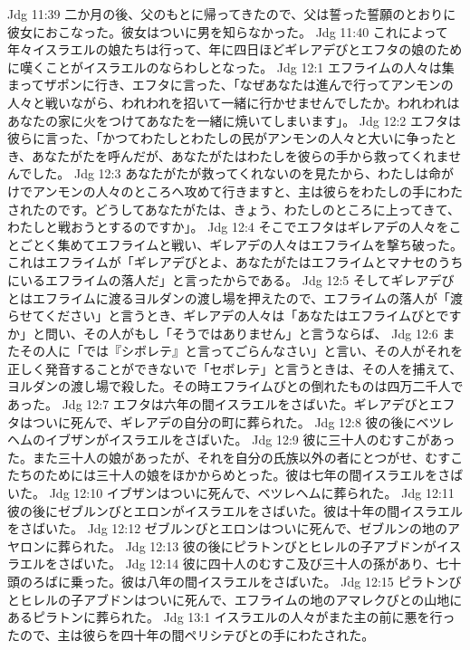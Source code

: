 Jdg 11:39  二か月の後、父のもとに帰ってきたので、父は誓った誓願のとおりに彼女におこなった。彼女はついに男を知らなかった。
Jdg 11:40  これによって年々イスラエルの娘たちは行って、年に四日ほどギレアデびとエフタの娘のために嘆くことがイスラエルのならわしとなった。
Jdg 12:1  エフライムの人々は集まってザポンに行き、エフタに言った、「なぜあなたは進んで行ってアンモンの人々と戦いながら、われわれを招いて一緒に行かせませんでしたか。われわれはあなたの家に火をつけてあなたを一緒に焼いてしまいます」。
Jdg 12:2  エフタは彼らに言った、「かつてわたしとわたしの民がアンモンの人々と大いに争ったとき、あなたがたを呼んだが、あなたがたはわたしを彼らの手から救ってくれませんでした。
Jdg 12:3  あなたがたが救ってくれないのを見たから、わたしは命がけでアンモンの人々のところへ攻めて行きますと、主は彼らをわたしの手にわたされたのです。どうしてあなたがたは、きょう、わたしのところに上ってきて、わたしと戦おうとするのですか」。
Jdg 12:4  そこでエフタはギレアデの人々をことごとく集めてエフライムと戦い、ギレアデの人々はエフライムを撃ち破った。これはエフライムが「ギレアデびとよ、あなたがたはエフライムとマナセのうちにいるエフライムの落人だ」と言ったからである。
Jdg 12:5  そしてギレアデびとはエフライムに渡るヨルダンの渡し場を押えたので、エフライムの落人が「渡らせてください」と言うとき、ギレアデの人々は「あなたはエフライムびとですか」と問い、その人がもし「そうではありません」と言うならば、
Jdg 12:6  またその人に「では『シボレテ』と言ってごらんなさい」と言い、その人がそれを正しく発音することができないで「セボレテ」と言うときは、その人を捕えて、ヨルダンの渡し場で殺した。その時エフライムびとの倒れたものは四万二千人であった。
Jdg 12:7  エフタは六年の間イスラエルをさばいた。ギレアデびとエフタはついに死んで、ギレアデの自分の町に葬られた。
Jdg 12:8  彼の後にベツレヘムのイブザンがイスラエルをさばいた。
Jdg 12:9  彼に三十人のむすこがあった。また三十人の娘があったが、それを自分の氏族以外の者にとつがせ、むすこたちのためには三十人の娘をほかからめとった。彼は七年の間イスラエルをさばいた。
Jdg 12:10  イブザンはついに死んで、ベツレヘムに葬られた。
Jdg 12:11  彼の後にゼブルンびとエロンがイスラエルをさばいた。彼は十年の間イスラエルをさばいた。
Jdg 12:12  ゼブルンびとエロンはついに死んで、ゼブルンの地のアヤロンに葬られた。
Jdg 12:13  彼の後にピラトンびとヒレルの子アブドンがイスラエルをさばいた。
Jdg 12:14  彼に四十人のむすこ及び三十人の孫があり、七十頭のろばに乗った。彼は八年の間イスラエルをさばいた。
Jdg 12:15  ピラトンびとヒレルの子アブドンはついに死んで、エフライムの地のアマレクびとの山地にあるピラトンに葬られた。
Jdg 13:1  イスラエルの人々がまた主の前に悪を行ったので、主は彼らを四十年の間ペリシテびとの手にわたされた。
